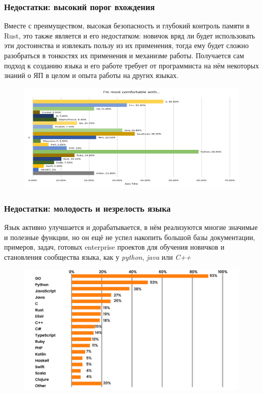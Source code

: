 \documentclass[11pt]{beamer}
\begin{document}
\begin{frame}
\frametitle{Недостатки: высокий порог вхождения}
Вместе с преимуществом, высокая безопасность и глубокий контроль памяти в Rust, это также является и его недостатком: новичок вряд ли будет использовать эти достоинства и извлекать пользу из их применения, тогда ему будет сложно разобраться в тонкостях их применения и механизме работы. Получается сам подход к созданию языка и его работе требует от программиста на нём некоторых знаний о ЯП в целом и опыта работы на других языках.
\begin{figure}
    \centering
    \includegraphics[width=0.8\linewidth]{image13.png}
\end{figure}
\end{frame}
\begin{frame}
\frametitle{Недостатки: молодость и незрелость языка}
Язык активно улучшается и дорабатывается, в нём реализуются многие значимые и полезные функции, но он ещё не успел накопить большой базы документации, примеров, задач, готовых enterprise проектов для обучения новичков и становления сообщества языка, как у \textit{python}, \textit{java} или \textit{C++}
\begin{figure}
    \centering
    \includegraphics[width=0.8\linewidth]{image14.png}
\end{figure}
\end{frame}
\end{document}
